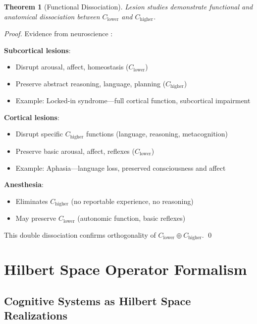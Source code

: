 \documentclass[11pt]{article}
\newtheorem{theorem}{Theorem}[section]
\begin{document}
\begin{theorem}[Functional Dissociation]\label{thm:dissociation}
Lesion studies demonstrate functional and anatomical dissociation between $C_{\text{lower}}$ and $C_{\text{higher}}$.
\end{theorem}

\begin{proof}
Evidence from neuroscience \citep{dehaene2011experimental}:

\textbf{Subcortical lesions}:
\begin{itemize}
\item Disrupt arousal, affect, homeostasis ($C_{\text{lower}}$)
\item Preserve abstract reasoning, language, planning ($C_{\text{higher}}$)
\item Example: Locked-in syndrome---full cortical function, subcortical impairment
\end{itemize}

\textbf{Cortical lesions}:
\begin{itemize}
\item Disrupt specific $C_{\text{higher}}$ functions (language, reasoning, metacognition)
\item Preserve basic arousal, affect, reflexes ($C_{\text{lower}}$)
\item Example: Aphasia---language loss, preserved consciousness and affect
\end{itemize}

\textbf{Anesthesia}:
\begin{itemize}
\item Eliminates $C_{\text{higher}}$ (no reportable experience, no reasoning)
\item May preserve $C_{\text{lower}}$ (autonomic function, basic reflexes)
\end{itemize}

This double dissociation confirms orthogonality of $C_{\text{lower}} \oplus C_{\text{higher}}$. \qed
\end{proof}

\section{Hilbert Space Operator Formalism}

\subsection{Cognitive Systems as Hilbert Space Realizations}
\end{document}
